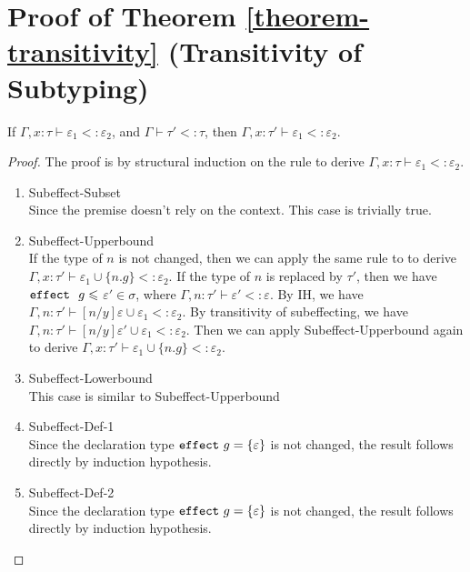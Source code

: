 \pagebreak

\appendix

\section{Proof of Theorem \ref{theorem-transitivity} (Transitivity of Subtyping)}

\begin{lemma}
If $\Gamma, x : \tau \vdash \varepsilon_1 <: \varepsilon_2$, and $\Gamma \vdash \tau' <: \tau$, then $\Gamma, x : \tau' \vdash \varepsilon_1 <: \varepsilon_2$.
\begin{proof}
The proof is by structural induction on the rule to derive $\Gamma, x : \tau \vdash \varepsilon_1 <: \varepsilon_2$. \begin{enumerate}
\item Subeffect-Subset\\
Since the premise doesn't rely on the context. This case is trivially true.
\item Subeffect-Upperbound\\
If the type of $n$ is not changed, then we can apply the same rule to to derive $\Gamma, x : \tau' \vdash \varepsilon_1 \cup \{n.g\}<: \varepsilon_2$. If the type of $n$ is replaced by $\tau'$, then we have $\mathtt{effect}~\ g \leqslant$ $\varepsilon' \in \sigma$, where $\Gamma, n: \tau' \vdash \varepsilon' <: \varepsilon$. By IH, we have $\Gamma, n : \tau' \vdash [n/y]\varepsilon \cup \varepsilon_1 <: \varepsilon_2$. By transitivity of subeffecting, we have $\Gamma, n : \tau' \vdash [n/y]\varepsilon' \cup \varepsilon_1 <: \varepsilon_2$. Then we can apply Subeffect-Upperbound again to derive $\Gamma, x : \tau' \vdash \varepsilon_1 \cup \{n.g\}<: \varepsilon_2$.
\item Subeffect-Lowerbound\\ This case is similar to Subeffect-Upperbound
\item Subeffect-Def-1\\ Since the declaration type $\mathtt{effect}~ g = \{\varepsilon\}$ is not changed, the result follows directly by induction hypothesis.
\item Subeffect-Def-2\\ Since the declaration type $\mathtt{effect}~ g = \{\varepsilon\}$ is not changed, the result follows directly by induction hypothesis.
\end{enumerate}
\end{proof}
\label{lemma-context-effect}
\end{lemma}

